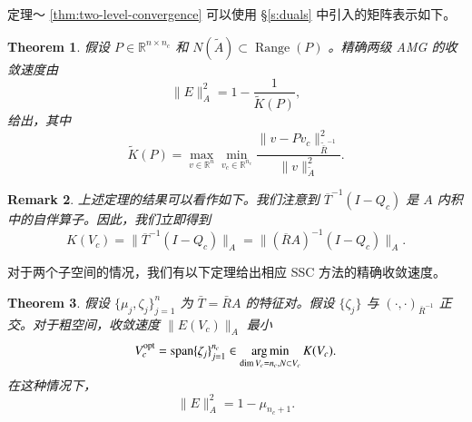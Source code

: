 \documentclass[12pt]{acta_2011xz}
\newcommand{\Tproj}{\ensuremath{Q_c}}
\newtheorem{theorem}{Theorem}[section]
\DeclareMathOperator*{\argmin}{arg\,min}
\newtheorem{remark}[theorem]{Remark}
\begin{document}
定理〜   \ref{thm:two-level-convergence}   可以使用   \S       \ref{s:duals}   中引入的矩阵表示如下。
   \begin{theorem}假设    $P\in \mathbb{R}^{n\times n_c}$    和    $N(\tilde A)\subset \operatorname{Range}(P)$    。精确两级 AMG 的收敛速度由
   \begin{equation}
        \|E\|_A^2 = 1-\frac{1}{\tilde K(P)},
    \end{equation}    给出，其中 
   \begin{equation}
        \tilde K(P)=\max_{v\in \mathbb{R}^n}\min_{v_c\in \mathbb{R}^{n_c}}\frac{\|v-Pv_c\|_{\tilde{\bar R}^{-1}}^2}{\|v\|_{\tilde A}^2}.
    \end{equation}     \end{theorem}     

   \begin{remark}上述定理的结果可以看作如下。我们注意到    $\overline{T}^{-1}(I-\Tproj)$    是    $A$    内积中的自伴算子。因此，我们立即得到
   $$ 
K(V_c) = \|\overline{T}^{-1} (I-\Tproj)\|_A= \|(\overline{R}A)^{-1}
(I-\Tproj)\|_A.
$$     \end{remark}     

对于两个子空间的情况，我们有以下定理给出相应 SSC 方法的精确收敛速度。
   \begin{theorem}   \label{thm:two-level-optimal}    假设    $ \{ \mu_j, \zeta_j \} _{j=1}^{n}$    为
   $\bar T = \bar {R} A$    的特征对。假设    $ \{ \zeta_j \} $    与    $(\cdot, \cdot)_{\bar R^{-1}}$    正交。对于粗空间，收敛速度    $\|E(V_c)\|_A$    最小
   \begin{equation}\label{another-vcopt}
    V_c^{\rm opt}=\operatorname{span} \{ \zeta_j \} _{j=1}^{n_c}\in \argmin_{\dim V_c=n_c, N\subset V_c}K(V_c). 
\end{equation}    在这种情况下，
   \begin{equation}
  \label{optimalrate}
    \|E\|_A^2=1-\mu_{n_c+1}.
\end{equation}     \end{theorem}     
\end{document}
